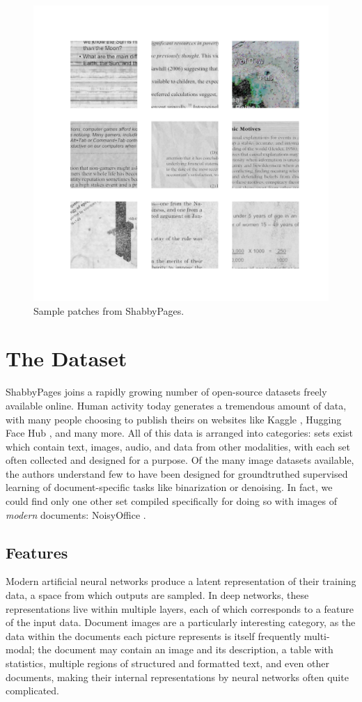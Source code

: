 \documentclass[runningheads]{llncs}
\begin{document}
\begin{figure}
\centering
\includegraphics[width=0.98\columnwidth, frame]{figures/matrix.png}
\caption{Sample patches from ShabbyPages.} \label{fig1}
\end{figure}

\section{The Dataset}
ShabbyPages joins a rapidly growing number of open-source datasets freely available online.
Human activity today generates a tremendous amount of data, with many people choosing to publish theirs on websites like Kaggle \cite{ref_Kaggle}, Hugging Face Hub \cite{ref_HuggingFaceHub}, and many more.
All of this data is arranged into categories: sets exist which contain text, images, audio, and data from other modalities, with each set often collected and designed for a purpose.
Of the many image datasets available, the authors understand few to have been designed for groundtruthed supervised learning of document-specific tasks like binarization or denoising.
In fact, we could find only one other set compiled specifically for doing so with images of \textit{modern} documents: NoisyOffice \cite{ref_NoisyOffice}.

\subsection{Features}
Modern artificial neural networks produce a latent representation of their training data, a space from which outputs are sampled.
In deep networks, these representations live within multiple layers, each of which corresponds to a feature of the input data.
Document images are a particularly interesting category, as the data within the documents each picture represents is itself frequently multi-modal; the document may contain an image and its description, a table with statistics, multiple regions of structured and formatted text, and even other documents, making their internal representations by neural networks often quite complicated.
\end{document}
